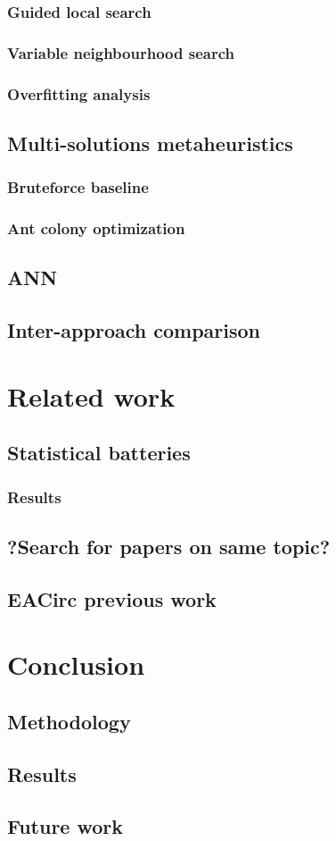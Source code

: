 \documentclass[
  print, %
  Table,   %
  nolof,     %
  nolot,     %
  11pt, %
  oneside  %
]{fithesis3}
\begin{document}
\subsection{Guided local search}



\subsection{Variable neighbourhood search}


\subsection{Overfitting analysis}
\section{Multi-solutions metaheuristics}
\subsection{Bruteforce baseline}
\subsection{Ant colony optimization}
\section{ANN}
\section{Inter-approach comparison}

\chapter{Related work}

\section{Statistical batteries}
\subsection{Results}
\section{?Search for papers on same topic?}
\section{EACirc previous work}

\chapter{Conclusion}

\section{Methodology}
\section{Results}
\section{Future work}
\end{document}
